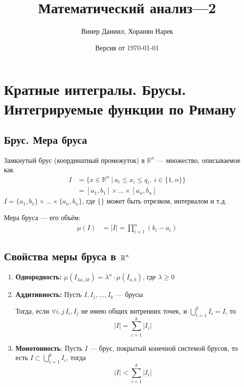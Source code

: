 \documentclass[a4paper, 10pt]{article}
\title{\LARGE{Математический анализ—2}}
\author{Винер Даниил, Хоранян Нарек}
\date{Версия от \today}
\begin{document}
\maketitle
\tableofcontents
\newpage
\setlength{\parindent}{15pt}
\setlength{\parskip}{2mm}
\section{Кратные интегралы. Брусы. Интегрируемые функции по Риману}
\subsection{Брус. Мера бруса}
 Замкнутый брус (координатный промежуток) в $\mathbb{R}^n$ — множество, описываемое как
\begin{equation*}
\begin{aligned}
    I&=\{x\in\mathbb{R}^n\ |\ a_i\leqslant x_i\leqslant q_i,\ i\in\{1,n\}\}\\
    &=\left[a_1,b_1\right]\times\ldots\times\left[a_n,b_n\right]
\end{aligned}
\end{equation*}
\comment $I=\{a_1,b_1\}\times\ldots\times\{a_n,b_n\}$, где $\{\}$ может быть отрезком, интервалом и т.д.

 Мера бруса — его объём:
\begin{equation*}
    \begin{aligned}
        \mu(I)&=|I|
        =\prod_{i=1}^{n} (b_i-a_i)
    \end{aligned}
\end{equation*}

\subsection{Свойства меры бруса в $\operatorname{\mathbb{R}}^n$}
\begin{enumerate}
    \item \textbf{Однородность:} $\mu(I_{\lambda a,\lambda b})=\lambda^n\cdot\mu(I_{a,b})$, где $\lambda\geqslant
    0$
    \item \textbf{Аддитивность:} Пусть $I, I_1, \ldots, I_k$ — брусы
    
    Тогда, если $\forall i, j\, I_i, I_j$ не имею общих внтренних точек, и $\displaystyle\bigcup_{i=1}^kI_i = I$, то
    $$|I| = \sum_{i=1}^k|I_i|$$
    \item \textbf{Монотонность}: Пусть $I$ — брус, покрытый конечной системой брусов, то есть $I\subset \displaystyle\bigcup_{i=1}^kI_i$, тогда
    $$|I| < \sum_{i=1}^k|I_i|$$
\end{enumerate}
\end{document}
